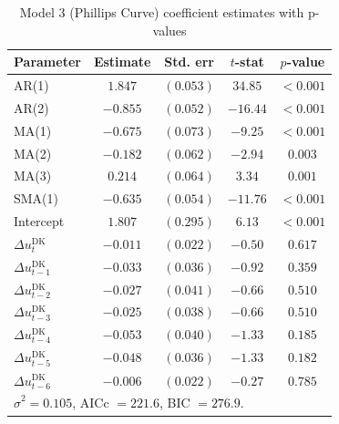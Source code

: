 \begin{table}[H]
\centering
\caption{Model 3 (Phillips Curve) coefficient estimates with p-values}
\small{
\begin{tabular*}{\textwidth}{@{\extracolsep{\fill}}lcccc}
\hline \hline
\rule{0pt}{12pt}\textbf{Parameter} & \textbf{Estimate} & \textbf{Std. err} & \textbf{$t$-stat} & \textbf{$p$-value} \\[4pt]
\hline
\rule{0pt}{12pt}AR(1)        & $1.847$  & $(0.053)$ & $34.85$  & $<0.001$ \\[4pt]
AR(2)                        & $-0.855$ & $(0.052)$ & $-16.44$ & $<0.001$ \\[4pt]
MA(1)                        & $-0.675$ & $(0.073)$ & $-9.25$  & $<0.001$ \\[4pt]
MA(2)                        & $-0.182$ & $(0.062)$ & $-2.94$  & $0.003$  \\[4pt]
MA(3)                        & $0.214$  & $(0.064)$ & $3.34$   & $0.001$  \\[4pt]
SMA(1)                       & $-0.635$ & $(0.054)$ & $-11.76$ & $<0.001$ \\[4pt]
Intercept                    & $1.807$  & $(0.295)$ & $6.13$   & $<0.001$ \\[4pt]
\hline
\rule{0pt}{12pt}$\Delta u^{\text{DK}}_{t}$   & $-0.011$ & $(0.022)$ & $-0.50$ & $0.617$ \\[4pt]
$\Delta u^{\text{DK}}_{t-1}$                 & $-0.033$ & $(0.036)$ & $-0.92$ & $0.359$ \\[4pt]
$\Delta u^{\text{DK}}_{t-2}$                 & $-0.027$ & $(0.041)$ & $-0.66$ & $0.510$ \\[4pt]
$\Delta u^{\text{DK}}_{t-3}$                 & $-0.025$ & $(0.038)$ & $-0.66$ & $0.510$ \\[4pt]
$\Delta u^{\text{DK}}_{t-4}$                 & $-0.053$ & $(0.040)$ & $-1.33$ & $0.185$ \\[4pt]
$\Delta u^{\text{DK}}_{t-5}$                 & $-0.048$ & $(0.036)$ & $-1.33$ & $0.182$ \\[4pt]
$\Delta u^{\text{DK}}_{t-6}$                 & $-0.006$ & $(0.022)$ & $-0.27$ & $0.785$ \\[4pt]
\hline \hline
\multicolumn{5}{l}{\rule{0pt}{12pt}\footnotesize $\hat{\sigma}^2 = 0.105$,\;
AICc $= 221.6$,\; BIC $= 276.9$.}
\end{tabular*}
}
\label{tab:phillips_coef_appendix}
\end{table}


